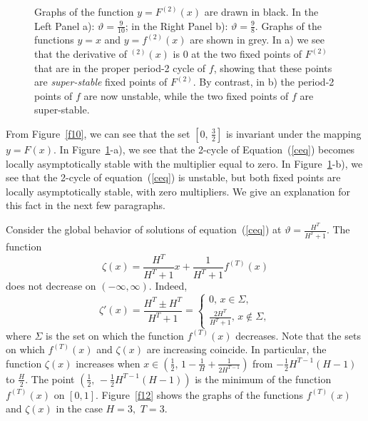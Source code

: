 \documentclass[12pt,a4paper]{amsart}
\begin{document}
\begin{figure}[h!]
\begin{minipage}[h]{0.45\linewidth}
\end{minipage}
\caption{Graphs of the function $y = F^{(2)}(x)$ are drawn in black.  In the Left Panel a): $\vartheta=\frac{9}{10}$; in the Right Panel b): $\vartheta=\frac{9}{8}$.
Graphs of the functions $y=x$ and $y=f^{(2)}(x)$ are shown in grey.
In a) we see that the derivative of $^{(2)}(x)$ is 0 at the two fixed points of $F^{(2)}$ that are in the proper period-2 cycle of $f$, showing that these points are {\it super-stable} fixed points of $F^{(2)}$.  By contrast, in b) the period-2 points of $f$ are now unstable, while the two fixed points of $f$ are super-stable.}\label{f11}
\end{figure}

From Figure~\ref{f10}, we can see that the set $\left[ 0,\,\frac32\right]$ is invariant under the mapping $y=F(x)$.  In  Figure~\ref{f11}-a), we see that 
 the 2-cycle of Equation~(\ref{ceq}) becomes locally asymptotically stable with the multiplier equal to zero. In
Figure~\ref{f11}-b), we see that the 2-cycle of equation~(\ref{ceq}) is unstable, but both fixed points are locally asymptotically stable,  
with zero multipliers. We give an explanation for this fact in the next few paragraphs.

Consider the global behavior of solutions of equation~(\ref{ceq}) at $\vartheta = \frac{H^T}{H^T+1}.$ The function 
$$
\zeta (x) = \frac{H^T}{H^T+1} x + \frac{1}{H^T+1}	f^{(T)}(x)
$$
does not decrease on $(-\infty,\infty).$ Indeed, 
$$
\zeta'(x) = \frac{H^T \pm H^T}{H^T+1} =
\left\{\begin{array}{ll}
0,\,x\in \Sigma, \\
\frac{2 H^T}{H^T+1},\,x \notin\Sigma,
\end{array}\right.
$$
where $\Sigma$ is the set on which the function $f^{(T)}(x)$ decreases. Note that the sets on which  $f^{(T)}(x)$ 
and $\zeta (x)$ are increasing coincide. In particular, the function $\zeta (x)$ increases when 
$x \in \left( \frac12,\, 1-\frac{1}{H}+\frac{1}{2 H^{T-1}} \right)$ from $-\frac12 H^{T-1} (H-1)$ to $\frac{H}{2}.$ The point 
$\left( \frac12,\, -\frac12 H^{T-1} (H-1) \right)$ is the minimum of the function $f^{(T)}(x)$ on $[0,1]$. Figure~\ref{f12} 
shows the graphs of the functions $f^{(T)}(x)$ and $\zeta (x)$ in the case $H=3,$ $T=3.$
\end{document}
